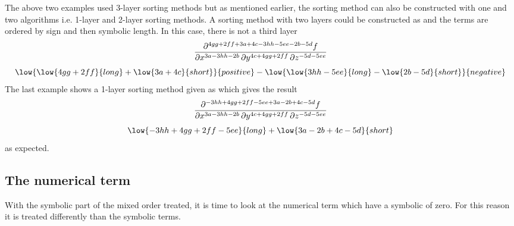 	The above two examples used 3-layer sorting methods but as mentioned earlier, the sorting method can also be constructed with one and two algorithms i.e. 1-layer and 2-layer sorting methods. A sorting method with two layers could be constructed as  and the terms are ordered by sign and then symbolic length. In this case, there is not a third layer
	\begin{equation*}
		\pdv[sort-method = {sign,symbol}, order={3a-3hh-2b, 4c+4gg+2ff, -5d-5ee}]{f}{x,y,z}
	\end{equation*}
	\begin{equation*}
		\low{
			\low{ 4gg + 2ff }{long} +
			\low{ 3a  + 4c  }{short}
		}{positive} -
		\low{
			\low{ 3hh - 5ee }{long} -
			\low{ 2b  - 5d  }{short}
		}{negative}
	\end{equation*}
	The last example shows a 1-layer sorting method given as  which gives the result
	\begin{equation*}
		\pdv[sort-method = symbol, order={3a-3hh-2b, 4c+4gg+2ff, -5d-5ee}]{f}{x,y,z}
	\end{equation*}
	\begin{equation*}
		\low{ - 3hh + 4gg + 2ff - 5ee }{long} +
		\low{   3a  - 2b  + 4c  - 5d  }{short}
	\end{equation*}
	as expected.
	
	\subsection{The numerical term} \label{ssec:sort-numerical}
	With the symbolic part of the mixed order treated, it is time to look at the numerical term which have a symbolic of zero. For this reason it is treated differently than the symbolic terms.
	
